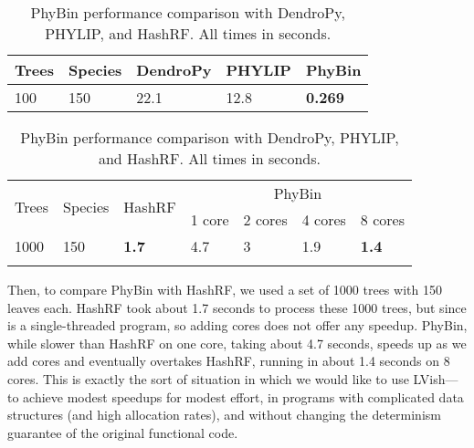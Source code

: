 \begin{table}[h]

\begin{tabularx}{.75\textwidth}{XXXXX}
Trees & Species & DendroPy & PHYLIP & PhyBin    \\ \hline
100   & 150     & 22.1     & 12.8   & \textbf{0.269}
\end{tabularx}

\vspace{8mm}

\begin{tabularx}{\textwidth}{XXXXXXX}
\multirow{2}{*}{Trees} & \multirow{2}{*}{Species} & \multirow{2}{*}{HashRF} & \multicolumn{4}{c}{PhyBin}                \\
                       &                          &                         & 1 core & 2 cores & 4 cores & 8 cores      \\ \hline
1000                   & 150                      & \textbf{1.7}            & 4.7    & 3       & 1.9     & \textbf{1.4} \\
                       &                          &                         &        &         &         &              \\
\end{tabularx}
\caption{PhyBin performance comparison with DendroPy, PHYLIP, and
  HashRF.  All times in seconds.}
\label{t:phybin-bench}
\end{table}

Then, to compare PhyBin with HashRF, we used a set of 1000 trees with
150 leaves each.  HashRF took about 1.7 seconds to process these 1000
trees, but since is a single-threaded program, so adding cores does
not offer any speedup.  PhyBin, while slower than HashRF on one core,
taking about 4.7 seconds, speeds up as we add cores and eventually
overtakes HashRF, running in about 1.4 seconds on 8 cores.  This is
exactly the sort of situation in which we would like to use LVish---to
achieve modest speedups for modest effort, in programs with
complicated data structures (and high allocation rates), and without
changing the determinism guarantee of the original functional code.

